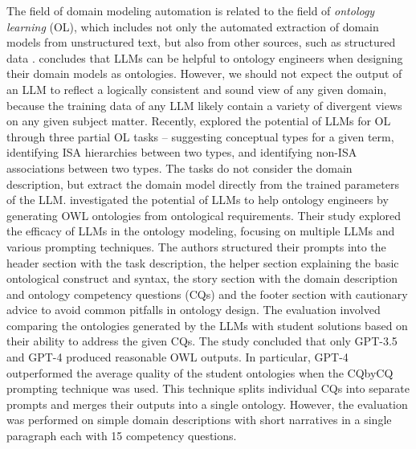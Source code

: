 The field of domain modeling automation is related to the field of \emph{ontology learning} (OL)\cite{Konys2019,Khadir2021}, which includes not only the automated extraction of domain models from unstructured text, but also from other sources, such as structured data \cite{Lakzaei2021}.
\citet{Neuhaus2023} concludes that LLMs can be helpful to ontology engineers when designing their domain models as ontologies. However, we should not expect the output of an LLM to reflect a logically consistent and sound view of any given domain, because the training data of any LLM likely contain a variety of divergent views on any given subject matter.
Recently, \citet{BabaeiGiglou2023} explored the potential of LLMs for OL through three partial OL tasks -- suggesting conceptual types for a given term, identifying ISA hierarchies between two types, and identifying non-ISA associations between two types. The tasks do not consider the domain description, but extract the domain model directly from the trained parameters of the LLM.
\citet{Saeedizade2024} investigated the potential of LLMs to help ontology engineers by generating OWL ontologies from ontological requirements.
Their study explored the efficacy of LLMs in the ontology modeling, focusing on multiple LLMs and various prompting techniques.
The authors structured their prompts into the header section with the task description, the helper section explaining the basic ontological construct and syntax, the story section with the domain description and ontology competency questions (CQs) and the footer section with cautionary advice to avoid common pitfalls in ontology design.
The evaluation involved comparing the ontologies generated by the LLMs with student solutions based on their ability to address the given CQs.
The study concluded that only GPT-3.5 and GPT-4 produced reasonable OWL outputs.
In particular, GPT-4 outperformed the average quality of the student ontologies when the CQbyCQ prompting technique was used.
This technique splits individual CQs into separate prompts and merges their outputs into a single ontology.
However, the evaluation was performed on simple domain descriptions with short narratives in a single paragraph each with 15 competency questions.
